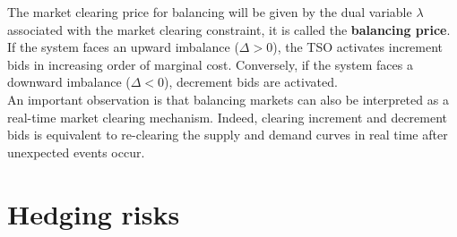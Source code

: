 \documentclass[12pt, openany]{report}
\theoremstyle{definition}
\begin{document}
The market clearing price for balancing will be given by the dual variable $\lambda$ associated with the market clearing constraint, it is called the \textbf{balancing price}. If the system faces an upward imbalance ($\Delta>0$), the TSO activates increment bids in increasing order of marginal cost. Conversely, if the system faces a downward imbalance ($\Delta<0$), decrement bids are activated.\\
An important observation is that balancing markets can also be interpreted as a real-time market clearing mechanism. Indeed, clearing increment and decrement bids is equivalent to re-clearing the supply and demand curves in real time after unexpected events occur. 
\chapter{Hedging risks}
\end{document}

